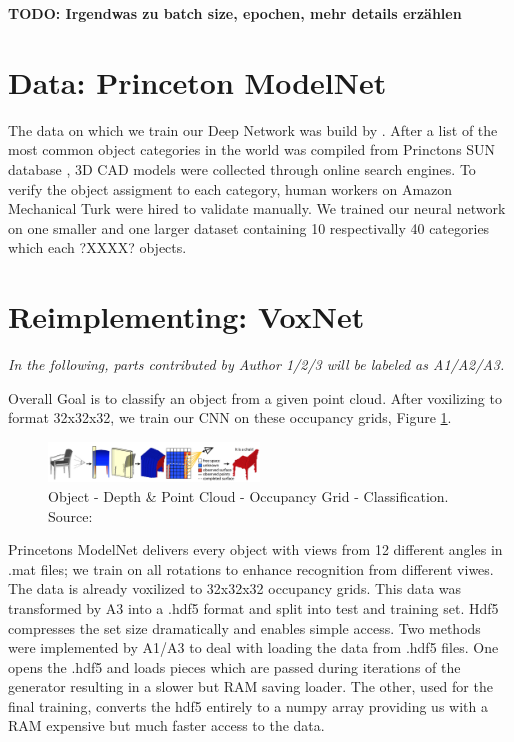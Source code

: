 \documentclass[10pt,twocolumn,letterpaper]{article}
\begin{document}
\textbf{TODO: Irgendwas zu batch size, epochen, mehr details erzählen}

\section{Data: Princeton ModelNet}

The data on which we train our Deep Network was build by \cite{shape}. After a list of the most
common object categories in the world was compiled from Princtons SUN database \cite{sun}, 3D CAD models were collected through online 
search engines. To verify the object assigment to each category, human workers on Amazon Mechanical Turk were hired to validate manually. We trained our neural network on one smaller and one larger dataset containing 10 respectivally 40 categories which each ?XXXX? objects.

\section{Reimplementing: VoxNet \cite{maturana_iros_2015}}

\textit{In the following, parts contributed by Author 1/2/3 will be labeled 
as A1/A2/A3.}

Overall Goal is to classify an object from a given point cloud. After voxilizing to format 32x32x32, we train our CNN on these occupancy grids, Figure \ref{fig:algo}.

\begin{figure}[h]
	\label{fig:algo}
	\centering
	\includegraphics[width=0.5\textwidth]{figures/algo}
	\caption{ \newline Object - Depth \& Point Cloud - Occupancy Grid - Classification. Source: \cite{shape}}
\end{figure}

Princetons ModelNet delivers every object with views from 12 different angles in .mat files; we train on all rotations to enhance recognition from 
different viwes. The data is already voxilized to 32x32x32 occupancy grids.
This data was transformed by A3 into a .hdf5 format and split into test and training set. Hdf5 compresses the set size dramatically and enables simple access.
Two methods were implemented by A1/A3 to deal with loading the data from .hdf5 files. One opens the .hdf5 and loads pieces which are passed during iterations of the generator resulting in a slower but RAM saving loader. The other, used for the final training, converts the hdf5 entirely to a numpy array providing us with a RAM expensive but much faster access to the data.
\end{document}
